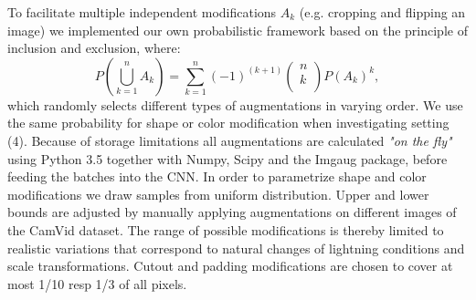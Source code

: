 \documentclass[a0paper,portrait]{baposter}
\begin{document}
\begin{poster}
{To facilitate multiple independent modifications $A_k$ (e.g. cropping and flipping an image) we implemented our own probabilistic framework based on the principle of inclusion and exclusion, where:
\[P\left(\bigcup_{k=1}^{n} A_k\right) = \sum_{k=1}^{n} (-1)^{(k+1)} \begin{pmatrix} n \\ k \\\end{pmatrix}P(A_k)^k,\]
which randomly selects different types of augmentations in varying order. We use the same probability for shape or color modification when investigating setting (4). Because of storage limitations all augmentations are calculated \textit{"on the fly"} using {\color{darkblue} Python 3.5} together with {\color{darkblue} Numpy}, {\color{darkblue} Scipy} and the {\color{darkblue} Imgaug} package, before feeding the batches into the CNN.
In order to parametrize shape and color modifications we draw samples from uniform distribution. Upper and lower bounds are adjusted by manually applying augmentations on different images of the CamVid dataset. The range of possible modifications is thereby limited to realistic variations that correspond to natural changes of lightning conditions and scale transformations. Cutout and padding modifications are chosen to cover at most 1/10 resp 1/3 of all pixels.

\vspace{20px}

}







\end{poster}
\end{document}
